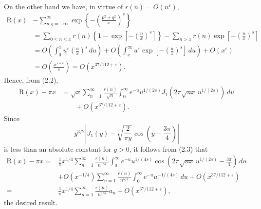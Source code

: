 \documentclass[11pt]{article}
\newcommand{\dd}{\,d}
\begin{document}
On the other hand we have, in virtue of $r(n)=O(n^\varepsilon)$,
\begin{align*}
\mathrm{R}(x)&-\sum_{p,q=-\infty}^{\infty}
 \exp\!\left\{-\left(\frac{p^2+q^2}{x}\right)^s\right\} \\
&=\sum_{0\leq n\leq x}r(n)
 \left\{1-\exp\!\left[-\left(\frac nx\right)^s\right]\right\}
 -\sum_{n>x}r(n)\exp\!\left[-\left(\frac nx\right)^s\right] \\
&=O\!\left(\int_0^x u^\varepsilon\left(\frac ux\right)^s\dd u\right)
 +O\!\left(\int_x^\infty u^\varepsilon
 \exp\!\left[-\left(\frac ux\right)^s\right]\dd u\right)
 +O\!\left(x^\varepsilon\right) \\
&=O\!\left(\frac{x^{1+\varepsilon}}s\right)
 =O\!\left(x^{37/112+\varepsilon}\right).
\end{align*}
Hence, from (2.2),
\begin{equation}
\begin{aligned}
 \mathrm{R}(x)-\pi x
 &=\sqrt{x}\sum_{n=1}^{\infty}\frac{r(n)}{\sqrt n}
 \int_0^\infty e^{-u}u^{1/(2s)}
 J_1\!\left(2\pi\sqrt{nx}\,u^{1/(2s)}\right)\dd u \\
 &\qquad+O\!\left(x^{37/112+\varepsilon}\right).
\end{aligned}
\tag{2.3}
\end{equation}
Since
\[
 y^{3/2}\left|J_1(y)-\sqrt{\frac{2}{\pi y}}
 \cos\!\left(y-\frac{3\pi}{4}\right)\right|
\]
is less than an absolute constant for $y>0$, it follows from (2.3) that
\begin{align*}
\mathrm{R}(x)-\pi x
={}&\frac1\pi x^{1/4}\sum_{n=1}^{\infty}\frac{r(n)}{n^{3/4}}
 \int_0^\infty e^{-u}u^{1/(4s)}
 \cos\!\left(2\pi\sqrt{nx}\,u^{1/(2s)}-\frac{3\pi}{4}\right)\dd u \\
&+O\!\left(x^{-1/4}\right)\sum_{n=1}^{\infty}\frac{r(n)}{n^{5/4}}
 \int_0^\infty e^{-u}u^{-1/(4s)}\dd u
 +O\!\left(x^{37/112+\varepsilon}\right) \\
={}&\frac1\pi x^{1/4}\sum_{n=1}^{\infty}\frac{r(n)}{n^{3/4}}a_n
 +O\!\left(x^{37/112+\varepsilon}\right),
\end{align*}
the desired result.
\end{document}
